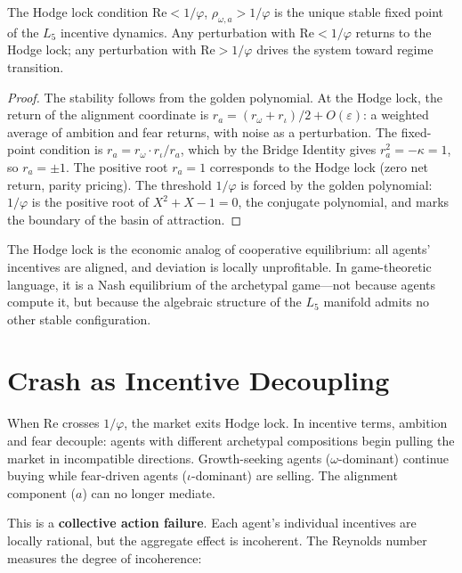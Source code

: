 \begin{theorem}\label{thm:hodge_eq}
The Hodge lock condition $\mathrm{Re} < 1/\varphi$, $\rho_{\omega,a} > 1/\varphi$ is the unique stable fixed point of the $L_5$ incentive dynamics. Any perturbation with $\mathrm{Re} < 1/\varphi$ returns to the Hodge lock; any perturbation with $\mathrm{Re} > 1/\varphi$ drives the system toward regime transition.
\end{theorem}

\begin{proof}
The stability follows from the golden polynomial. At the Hodge lock, the return of the alignment coordinate is $r_a = (r_\omega + r_\iota)/2 + O(\varepsilon)$: a weighted average of ambition and fear returns, with noise as a perturbation. The fixed-point condition is $r_a = r_\omega \cdot r_\iota / r_a$, which by the Bridge Identity gives $r_a^2 = -\kappa = 1$, so $r_a = \pm 1$. The positive root $r_a = 1$ corresponds to the Hodge lock (zero net return, parity pricing). The threshold $1/\varphi$ is forced by the golden polynomial: $1/\varphi$ is the positive root of $X^2 + X - 1 = 0$, the conjugate polynomial, and marks the boundary of the basin of attraction. \qedhere
\end{proof}

The Hodge lock is the economic analog of cooperative equilibrium: all agents' incentives are aligned, and deviation is locally unprofitable. In game-theoretic language, it is a Nash equilibrium of the archetypal game---not because agents compute it, but because the algebraic structure of the $L_5$ manifold admits no other stable configuration.

\section{Crash as Incentive Decoupling}

When Re crosses $1/\varphi$, the market exits Hodge lock. In incentive terms, ambition and fear decouple: agents with different archetypal compositions begin pulling the market in incompatible directions. Growth-seeking agents ($\omega$-dominant) continue buying while fear-driven agents ($\iota$-dominant) are selling. The alignment component ($a$) can no longer mediate.

This is a \textbf{collective action failure}. Each agent's individual incentives are locally rational, but the aggregate effect is incoherent. The Reynolds number measures the degree of incoherence:

